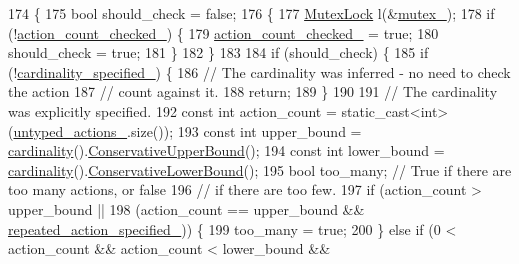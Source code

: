 \begin{DoxyCode}
174                                  \{
175   \textcolor{keywordtype}{bool} should\_check = \textcolor{keyword}{false};
176   \{
177     \hyperlink{namespacetesting_1_1internal_a08b187c6cc4e28400aadf9a32fccc8de}{MutexLock} l(&\hyperlink{classtesting_1_1internal_1_1ExpectationBase_a364f5473591d08d0ac03595c9050c13e}{mutex\_});
178     \textcolor{keywordflow}{if} (!\hyperlink{classtesting_1_1internal_1_1ExpectationBase_a19933e346f6493005437bdd6812c7a29}{action\_count\_checked\_}) \{
179       \hyperlink{classtesting_1_1internal_1_1ExpectationBase_a19933e346f6493005437bdd6812c7a29}{action\_count\_checked\_} = \textcolor{keyword}{true};
180       should\_check = \textcolor{keyword}{true};
181     \}
182   \}
183 
184   \textcolor{keywordflow}{if} (should\_check) \{
185     \textcolor{keywordflow}{if} (!\hyperlink{classtesting_1_1internal_1_1ExpectationBase_ad2ca7220ed1a395bd850ff06c500a402}{cardinality\_specified\_}) \{
186       \textcolor{comment}{// The cardinality was inferred - no need to check the action}
187       \textcolor{comment}{// count against it.}
188       \textcolor{keywordflow}{return};
189     \}
190 
191     \textcolor{comment}{// The cardinality was explicitly specified.}
192     \textcolor{keyword}{const} \textcolor{keywordtype}{int} action\_count = \textcolor{keyword}{static\_cast<}\textcolor{keywordtype}{int}\textcolor{keyword}{>}(\hyperlink{classtesting_1_1internal_1_1ExpectationBase_a9558ff6b8b1b7e3a99fac1f93d1826da}{untyped\_actions\_}.size());
193     \textcolor{keyword}{const} \textcolor{keywordtype}{int} upper\_bound = \hyperlink{classtesting_1_1internal_1_1ExpectationBase_a0396ade19a85bc2c43c77d9ef3d5ef1d}{cardinality}().\hyperlink{classtesting_1_1Cardinality_a45a6f7b06ddaa645b9eb9b11ed84d732}{ConservativeUpperBound}();
194     \textcolor{keyword}{const} \textcolor{keywordtype}{int} lower\_bound = \hyperlink{classtesting_1_1internal_1_1ExpectationBase_a0396ade19a85bc2c43c77d9ef3d5ef1d}{cardinality}().\hyperlink{classtesting_1_1Cardinality_a7888bbbd2890b79671aecff37e94ef1d}{ConservativeLowerBound}();
195     \textcolor{keywordtype}{bool} too\_many;  \textcolor{comment}{// True if there are too many actions, or false}
196     \textcolor{comment}{// if there are too few.}
197     \textcolor{keywordflow}{if} (action\_count > upper\_bound ||
198         (action\_count == upper\_bound && \hyperlink{classtesting_1_1internal_1_1ExpectationBase_abecd382b79252ffc0779d51e058b681c}{repeated\_action\_specified\_})) \{
199       too\_many = \textcolor{keyword}{true};
200     \} \textcolor{keywordflow}{else} \textcolor{keywordflow}{if} (0 < action\_count && action\_count < lower\_bound &&

\end{DoxyCode}
